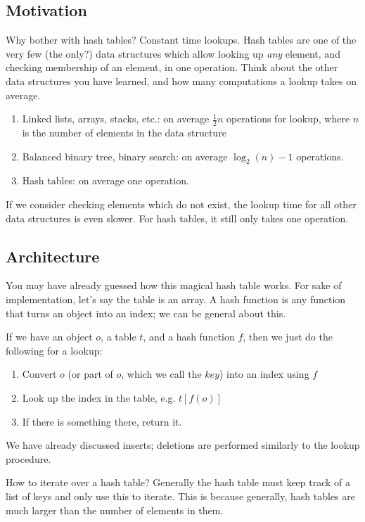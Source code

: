 \documentclass{article}
\begin{document}
\subsection{Motivation}
Why bother with hash tables?  Constant time lookups.  Hash tables are one of the very few (the only?) data structures which allow looking up \textit{any} element, and checking membership of an element, in one operation.  Think about the other data structures you have learned, and how many computations a lookup takes on average.

\begin{enumerate}
\item Linked lists, arrays, stacks, etc.: on average $\frac{1}{2}n$ operations for lookup, where $n$ is the number of elements in the data structure
\item Balanced binary tree, binary search: on average $\log_2 (n) - 1$ operations.
\item Hash tables: on average one operation.
\end{enumerate}

If we consider checking elements which do not exist, the lookup time for all other data structures is even slower.  For hash tables, it still only takes one operation.

\subsection{Architecture}

You may have already guessed how this magical hash table works.  For sake of implementation, let's say the table is an array.  A hash function is any function that turns an object into an index; we can be general about this.

If we have an object $o$, a table $t$, and a hash function $f$, then we just do the following for a lookup:

\begin{enumerate}
\item Convert $o$ (or part of $o$, which we call the $key$) into an index using $f$
\item Look up the index in the table, e.g. $t[f(o)]$
\item If there is something there, return it.
\end{enumerate}

We have already discussed inserts; deletions are performed similarly to the lookup procedure.

How to iterate over a hash table?  Generally the hash table must keep track of a list of keys and only use this to iterate.  This is because generally, hash tables are much larger than the number of elements in them.  
\end{document}
